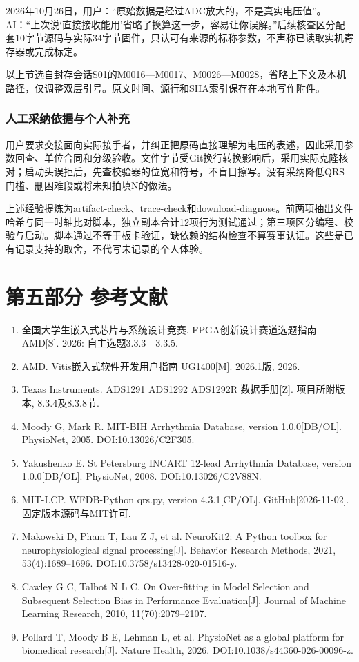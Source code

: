 \documentclass[UTF8,12pt,a4paper]{ctexart}
\begin{document}
2026年10月26日，用户：“原始数据是经过ADC放大的，不是真实电压值”。AI：“上次说‘直接接收能用’省略了换算这一步，容易让你误解。”后续核查区分配套10字节源码与实际34字节固件，只认可有来源的标称参数，不声称已读取实机寄存器或完成标定。

以上节选自封存会话S01的M0016—M0017、M0026—M0028，省略上下文及本机路径，仅调整双层引号。原文时间、源行和SHA索引保存在本地写作附件。

\subsubsection{人工采纳依据与个人补充}
用户要求交接面向实际接手者，并纠正把原码直接理解为电压的表述，因此采用参数回查、单位合同和分级验收。文件字节受Git换行转换影响后，采用实际克隆核对；启动头误拒后，先查校验器的位宽和符号，不盲目擦写。没有采纳降低QRS门槛、删困难段或将未知拍填N的做法。

上述经验提炼为artifact-check、trace-check和download-diagnose。前两项抽出文件哈希与同一时轴比对脚本，独立副本合计12项行为测试通过；第三项区分编程、校验与启动。脚本通过不等于板卡验证，缺依赖的结构检查不算赛事认证。这些是已有记录支持的取舍，不代写未记录的个人体验。

\section{第五部分 参考文献}
\begin{enumerate}
\setlength{\itemsep}{0pt}
\item 全国大学生嵌入式芯片与系统设计竞赛. FPGA创新设计赛道选题指南 AMD[S]. 2026: 自主选题3.3.3—3.3.5.
\item AMD. Vitis嵌入式软件开发用户指南 UG1400[M]. 2026.1版, 2026.
\item Texas Instruments. ADS1291 ADS1292 ADS1292R 数据手册[Z]. 项目所附版本, 8.3.4及8.3.8节.
\item Moody G, Mark R. MIT-BIH Arrhythmia Database, version 1.0.0[DB/OL]. PhysioNet, 2005. DOI:10.13026/C2F305.
\item Yakushenko E. St Petersburg INCART 12-lead Arrhythmia Database, version 1.0.0[DB/OL]. PhysioNet, 2008. DOI:10.13026/C2V88N.
\item MIT-LCP. WFDB-Python qrs.py, version 4.3.1[CP/OL]. GitHub[2026-11-02]. 固定版本源码与MIT许可.
\item Makowski D, Pham T, Lau Z J, et al. NeuroKit2: A Python toolbox for neurophysiological signal processing[J]. Behavior Research Methods, 2021, 53(4):1689--1696. DOI:10.3758/s13428-020-01516-y.
\item Cawley G C, Talbot N L C. On Over-fitting in Model Selection and Subsequent Selection Bias in Performance Evaluation[J]. Journal of Machine Learning Research, 2010, 11(70):2079--2107.
\item Pollard T, Moody B E, Lehman L, et al. PhysioNet as a global platform for biomedical research[J]. Nature Health, 2026. DOI:10.1038/s44360-026-00096-z.
\end{enumerate}
\end{document}
